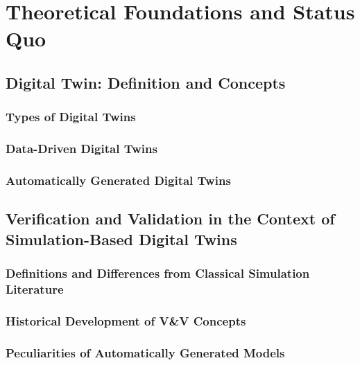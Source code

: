 \chapter{Theoretical Foundations and Status Quo}
\label{chap:theory}

\section{Digital Twin: Definition and Concepts}
\subsection{Types of Digital Twins}

\subsection{Data-Driven Digital Twins}

\subsection{Automatically Generated Digital Twins}

\section{Verification and Validation in the Context of Simulation-Based Digital Twins}
\subsection{Definitions and Differences from Classical Simulation Literature}

\subsection{Historical Development of V\&V Concepts}

\subsection{Peculiarities of Automatically Generated Models}

